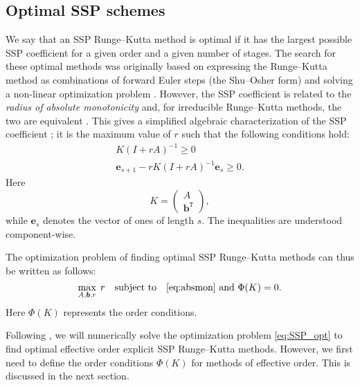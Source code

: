 \subsection{Optimal SSP schemes}\label{subsec:Optimal_SSPRK}
We say that an SSP Runge--Kutta method is optimal if it has the largest 
possible SSP coefficient for a given order and a given number of stages.
The search for these optimal methods was originally based on
expressing the Runge--Kutta method as combinations of forward Euler
steps (the Shu--Osher form) and solving a non-linear optimization
problem \cite{Gottlieb/Shu:1998, Gottlieb2001, Spiteri2003a, Spiteri2003b, 
Ruuth2004, Ruuth:2006}.
However, the SSP coefficient is related to the 
\emph{radius of absolute monotonicity} \cite{Kraaijevanger1991} and, 
for irreducible Runge--Kutta methods, the two are equivalent 
\cite{Ferracina2004, Higueras2004}.
This gives a simplified algebraic characterization of the SSP coefficient
\cite{Ferracina2005}; it is the maximum value of $r$ such that the following
conditions hold:
\begin{subequations} \label{eq:absmon}
\begin{align}
    K(I + rA)^{-1} \geq 0 \\
    \bm{e}_{s+1} - rK(I + rA)^{-1}\bm{e}_{s} \geq 0.
\end{align}
\end{subequations}
Here
\begin{equation*}
    K = \left(
            \begin{array}{c}
                     A              \\
                     \bm{b}^{\texttt{T}}
            \end{array}
         \right),
\end{equation*}
while $\bm{e}_s$ denotes the vector of ones of length $s$.
The inequalities are understood component-wise.

The optimization problem of finding optimal SSP Runge--Kutta methods
can thus be written as follows:
\begin{equation}\label{eq:SSP_opt}
    \max_{A, \bm{b}, r} \; r \quad \text{subject to} \quad 
                                           \text{\eqref{eq:absmon} and } \Phi(K) = 0.
\end{equation}
Here \( \Phi(K) \) represents the  order conditions.

Following \cite{Ketcheson2008, Ketcheson/Macdonald/Gottlieb:2009}, 
we will numerically solve the optimization problem \eqref{eq:SSP_opt} to find
optimal effective order explicit SSP Runge--Kutta methods.
However, we first need to define the order conditions $\Phi(K)$ for methods
of effective order.
This is discussed in the next section.
